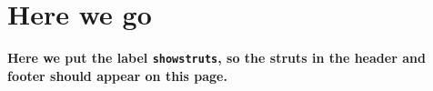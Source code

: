 \documentclass[openany]{book}
\begin{document}
\section{Here we go}

\lipsum[1-3]

\medskip
\noindent
\begin{boxedminipage}{\textwidth}
\textbf{Here we put the label \texttt{showstruts}, so the struts in the header and footer should appear on this page.}
\label{showstruts}
\end{boxedminipage}%
\nopagebreak
\setlength{\headheight}{16pt}%
\addtolength{\topmargin}{-4.0pt}
\medskip

\lipsum[3-5]
\end{document}
